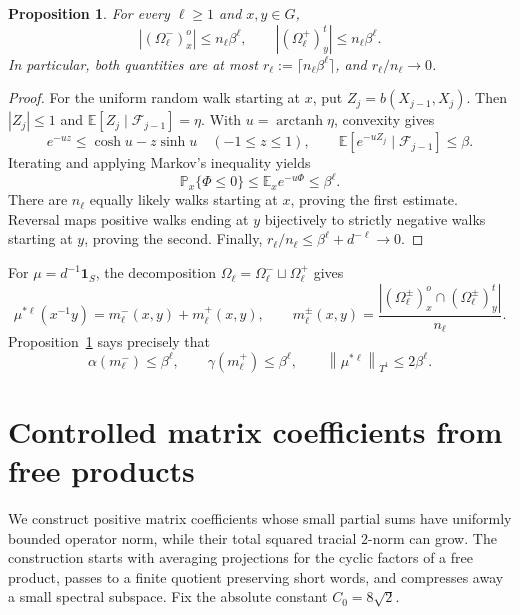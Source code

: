 \documentclass[a4paper,11pt]{amsproc}
\numberwithin{equation}{section}
\newtheorem{proposition}[theorem]{Proposition}
\theoremstyle{definition}
\newcommand{\E}{\mathbb E}
\newcommand{\Prob}{\mathbb P}
\newcommand{\one}{\mathbf 1}
\newcommand{\norm}[1]{\left\lVert#1\right\rVert}
\begin{document}
\begin{proposition}\label{prop:walks}
For every $\ell\ge1$ and $x,y\in G$,
\begin{equation}\label{eq:loads}
 |(\Omega_\ell^-)_x^o|\le n_\ell\beta^\ell,\qquad
 |(\Omega_\ell^+)_y^t|\le n_\ell\beta^\ell.
\end{equation}
In particular, both quantities are at most $r_\ell:=\lceil n_\ell\beta^\ell\rceil$, and $r_\ell/n_\ell\to0$.
\end{proposition}
\begin{proof}
For the uniform random walk starting at $x$, put $Z_j=b(X_{j-1},X_j)$. Then $|Z_j|\le1$ and $\E[Z_j\mid\mathcal F_{j-1}]=\eta$. With $u=\operatorname{arctanh}\eta$, convexity gives
\[
 e^{-uz}\le\cosh u-z\sinh u\quad(-1\le z\le1),\qquad
 \E[e^{-uZ_j}\mid\mathcal F_{j-1}]\le\beta.
\]
Iterating and applying Markov's inequality yields
\begin{equation}\label{eq:markov-tail}
 \Prob_x\{\Phi\le0\}\le\E_xe^{-u\Phi}\le\beta^\ell.
\end{equation}
There are $n_\ell$ equally likely walks starting at $x$, proving the first estimate. Reversal maps positive walks ending at $y$ bijectively to strictly negative walks starting at $y$, proving the second. Finally,
$r_\ell/n_\ell\le\beta^\ell+d^{-\ell}\to0$.
\end{proof}

For $\mu=d^{-1}\one_S$, the decomposition $\Omega_\ell=\Omega_\ell^-\sqcup\Omega_\ell^+$ gives
\[
 \mu^{*\ell}(x^{-1}y)=m_\ell^-(x,y)+m_\ell^+(x,y),\qquad
 m_\ell^\pm(x,y)=\frac{|(\Omega_\ell^\pm)_x^o\cap(\Omega_\ell^\pm)_y^t|}{n_\ell}.
\]
Proposition~\ref{prop:walks} says precisely that
\begin{equation}\label{eq:littlewood-flow}
 \alpha(m_\ell^-)\le\beta^\ell,\qquad
 \gamma(m_\ell^+)\le\beta^\ell,\qquad
 \norm{\mu^{*\ell}}_{T^1}\le2\beta^\ell.
\end{equation}

\section{Controlled matrix coefficients from free products}
We construct positive matrix coefficients whose small partial sums have uniformly bounded operator norm, while their total squared tracial $2$-norm can grow. The construction starts with averaging projections for the cyclic factors of a free product, passes to a finite quotient preserving short words, and compresses away a small spectral subspace. Fix the absolute constant $C_0=8\sqrt2$.
\end{document}
